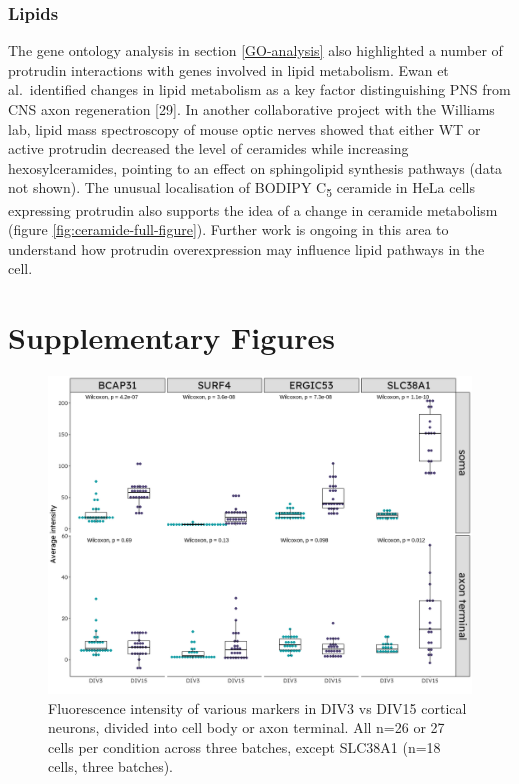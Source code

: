 \documentclass[
  12pt,
  a4paper,
]{book}
\begin{document}
\hypertarget{lipids}{%
\subsection{Lipids}\label{lipids}}

The gene ontology analysis in section \ref{GO-analysis} also highlighted a number of protrudin interactions with genes involved in lipid metabolism. Ewan et al.~identified changes in lipid metabolism as a key factor distinguishing PNS from CNS axon regeneration {[}29{]}. In another collaborative project with the Williams lab, lipid mass spectroscopy of mouse optic nerves showed that either WT or active protrudin decreased the level of ceramides while increasing hexosylceramides, pointing to an effect on sphingolipid synthesis pathways (data not shown). The unusual localisation of BODIPY C\textsubscript{5} ceramide in HeLa cells expressing protrudin also supports the idea of a change in ceramide metabolism (figure \ref{fig:ceramide-full-figure}). Further work is ongoing in this area to understand how protrudin overexpression may influence lipid pathways in the cell.

\hypertarget{SUPPLEMENT}{%
\chapter*{Supplementary Figures}\label{SUPPLEMENT}}


\begin{figure}
\includegraphics{../figures/full/suppl-dev-grid-1} \caption[Supplementary figure; marker intensity in cell bodies and axon terminals of developing cortical neurons]{Fluorescence intensity of various markers in DIV3 vs DIV15 cortical neurons, divided into cell body or axon terminal.  All n=26 or 27 cells per condition across three batches, except SLC38A1 (n=18 cells, three batches).}\label{fig:suppl-dev-grid}
\end{figure}
\end{document}
